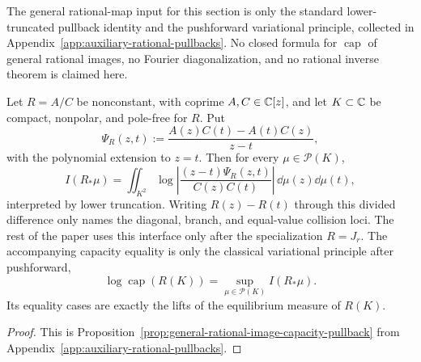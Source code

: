 The general rational-map input for this section is only the standard
lower-truncated pullback identity and the pushforward variational
principle, collected in Appendix~\ref{app:auxiliary-rational-pullbacks}.
No closed formula for \(\operatorname{cap}\) of general rational images,
no Fourier diagonalization, and no rational inverse theorem is claimed
here.
\begin{proposition}\label{prop:main-rational-pullback-interface}
Let \(R=A/C\) be nonconstant, with coprime \(A,C\in\mathbb{C}[z]\), and let
\(K\subset\mathbb{C}\) be compact, nonpolar, and pole-free for \(R\).  Put
\[
\Psi_R(z,t):=\frac{A(z)C(t)-A(t)C(z)}{z-t},
\]
with the polynomial extension to \(z=t\).  Then for every
\(\mu\in\mathcal P(K)\),
\[
I(R_\ast\mu)=
\iint_{K^2}\log\left|
\frac{(z-t)\Psi_R(z,t)}{C(z)C(t)}
\right|\,\dd\mu(z)\dd\mu(t),
\]
interpreted by lower truncation.  Writing \(R(z)-R(t)\) through this
divided difference only names the diagonal, branch, and equal-value
collision loci.  The rest of the paper uses this interface only after
the specialization \(R=J_r\).
The accompanying capacity equality is only the classical variational
principle after pushforward,
\[
\log\operatorname{cap}(R(K))
=\sup_{\mu\in\mathcal P(K)}I(R_\ast\mu).
\]
Its equality cases are exactly the lifts of the equilibrium measure of
\(R(K)\).
\end{proposition}

\begin{proof}
This is Proposition~\ref{prop:general-rational-image-capacity-pullback}
from Appendix~\ref{app:auxiliary-rational-pullbacks}.
\end{proof}

